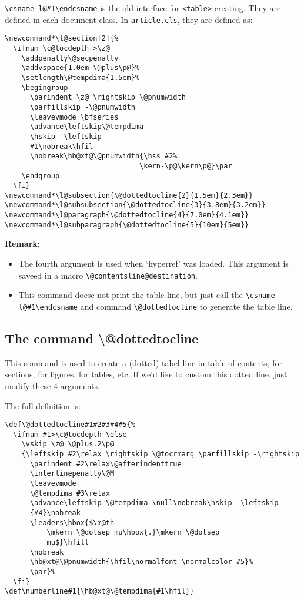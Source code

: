\documentclass{article}
\begin{document}
\verb|\csname l@#1\endcsname| is the old interface for \verb|<table>| creating. They are defined in each document class. In 
\verb|article.cls|, they are defined as:
\begin{lstlisting}
\newcommand*\l@section[2]{%
  \ifnum \c@tocdepth >\z@
    \addpenalty\@secpenalty
    \addvspace{1.0em \@plus\p@}%
    \setlength\@tempdima{1.5em}%
    \begingroup
      \parindent \z@ \rightskip \@pnumwidth
      \parfillskip -\@pnumwidth
      \leavevmode \bfseries
      \advance\leftskip\@tempdima
      \hskip -\leftskip
      #1\nobreak\hfil
      \nobreak\hb@xt@\@pnumwidth{\hss #2%
                                \kern-\p@\kern\p@}\par
    \endgroup
  \fi}
\newcommand*\l@subsection{\@dottedtocline{2}{1.5em}{2.3em}}
\newcommand*\l@subsubsection{\@dottedtocline{3}{3.8em}{3.2em}}
\newcommand*\l@paragraph{\@dottedtocline{4}{7.0em}{4.1em}}
\newcommand*\l@subparagraph{\@dottedtocline{5}{10em}{5em}}
\end{lstlisting}

\textbf{Remark}: 
\begin{itemize}
  \item The fourth argument is used when `hyperref' was loaded. This argument is saveed in a 
  macro \verb|\@contentsline@destination|. 
  \item This command doese not print the table line, but just call the \verb|\csname l@#1\endcsname|
  and command \verb|\@dottedtocline| to generate the table line.
\end{itemize}


\subsection{The command \textbackslash @dottedtocline}
This command is used to create a (dotted) tabel line in table of contents, for sections, for figures, for tables, etc.
If we'd like to custom this dotted line, just modify these 4 arguments.


The full definition is:
\begin{lstlisting}
\def\@dottedtocline#1#2#3#4#5{%
  \ifnum #1>\c@tocdepth \else
    \vskip \z@ \@plus.2\p@
    {\leftskip #2\relax \rightskip \@tocrmarg \parfillskip -\rightskip
      \parindent #2\relax\@afterindenttrue
      \interlinepenalty\@M
      \leavevmode
      \@tempdima #3\relax
      \advance\leftskip \@tempdima \null\nobreak\hskip -\leftskip
      {#4}\nobreak
      \leaders\hbox{$\m@th
          \mkern \@dotsep mu\hbox{.}\mkern \@dotsep
          mu$}\hfill
      \nobreak
      \hb@xt@\@pnumwidth{\hfil\normalfont \normalcolor #5}%
      \par}%
  \fi}
\def\numberline#1{\hb@xt@\@tempdima{#1\hfil}}
\end{lstlisting}
\end{document}
